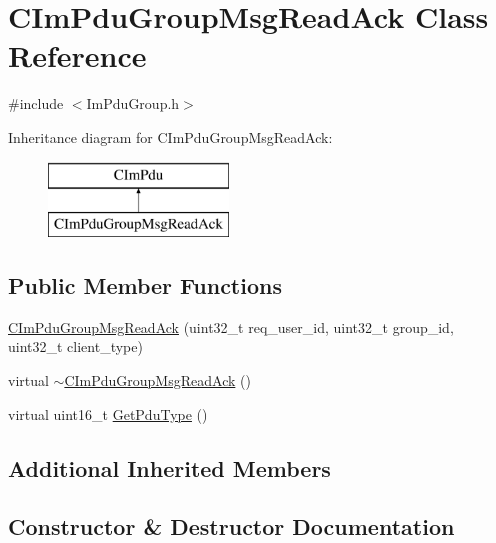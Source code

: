 \hypertarget{class_c_im_pdu_group_msg_read_ack}{}\section{C\+Im\+Pdu\+Group\+Msg\+Read\+Ack Class Reference}
\label{class_c_im_pdu_group_msg_read_ack}


{\ttfamily \#include $<$Im\+Pdu\+Group.\+h$>$}

Inheritance diagram for C\+Im\+Pdu\+Group\+Msg\+Read\+Ack\+:\begin{figure}[H]
\begin{center}
\leavevmode
\includegraphics[height=2.000000cm]{class_c_im_pdu_group_msg_read_ack}
\end{center}
\end{figure}
\subsection*{Public Member Functions}
\begin{DoxyCompactItemize}
\item 
\hyperlink{class_c_im_pdu_group_msg_read_ack_a9f16f2157572a486806b8e0ff84419d1}{C\+Im\+Pdu\+Group\+Msg\+Read\+Ack} (uint32\+\_\+t req\+\_\+user\+\_\+id, uint32\+\_\+t group\+\_\+id, uint32\+\_\+t client\+\_\+type)
\item 
virtual \hyperlink{class_c_im_pdu_group_msg_read_ack_ad2394e61bb6cf221b7f93ead29532ed0}{$\sim$\+C\+Im\+Pdu\+Group\+Msg\+Read\+Ack} ()
\item 
virtual uint16\+\_\+t \hyperlink{class_c_im_pdu_group_msg_read_ack_a076f2dc5f1dc6398c4dcfebfd9c10972}{Get\+Pdu\+Type} ()
\end{DoxyCompactItemize}
\subsection*{Additional Inherited Members}


\subsection{Constructor \& Destructor Documentation}
\hypertarget{class_c_im_pdu_group_msg_read_ack_a9f16f2157572a486806b8e0ff84419d1}{}

